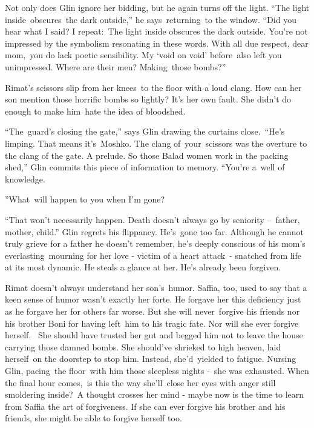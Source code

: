 \documentclass[twoside,11pt]{book}
\begin{document}
{Not only does Glin
}ignore{ her bidding, but he again turns off the light. ``The light
inside~o}bscures\ {the dark outside,{}'' he says\ returning\ to the
window. ``Did you hear what I said? I
repeat}{:}{\ The light inside
}obscures{ the dark outside. You're not impressed by the symbolism
resonating in these words. With all due respect, }dear mom,\ {you do
lack poetic sensibility. My `void on void' }before\ also left you
unimpressed.{ Where are their men?
}Making{~those bombs?''}

Rimat's scissors slip from her knees\ to the floor with a loud clang. How can her son mention those horrific bombs so
lightly? It's her own fault. She didn't do enough to make him\ hate the idea of bloodshed.

{}``The~guard{}'s closing the gate,{}'' says Glin drawing the curtains close.\ {}``He's limping. That means
it's\ Moshko. The clang of~your~scissors was the overture to the clang of the gate. A prelude. So those Balad women
work in the packing shed,{}'' Glin commits this piece of information to memory. ``You're a~well of
knowledge.{\textquotedbl}

{}''What\ will happen to you when I'm gone?{\textquotedbl}\ 

{}``That won't necessarily happen. Death doesn't always go by seniority --\ father, mother, child.'' Glin regrets his
flippancy. He{}'s\ gone too far. Although he cannot truly grieve for a father he doesn't remember, he{}'s deeply
conscious of his mom{}'s everlasting\ mourning for her love -  victim of a heart attack\ {}- snatched from life at its
most dynamic. He steals a glance at her. He{}'s already been forgiven.

{Rimat doesn't always understand her son's~humor. Saffia, too, used to
say that a keen sense of humor wasn't exactly her forte. }He forgave her this deficiency just as he forgave her for
others far worse. But she will never\ forgive his friends nor his brother Boni for having left~him to his tragic fate.
Nor will she ever forgive herself.~ She should have trusted her gut and begged him not to leave the house carrying
those damned bombs. She should've shrieked to high heaven, laid herself\ on the doorstep to stop him. Instead,
she'd~yielded to fatigue. Nursing Glin, pacing\ the floor\ with him those sleepless nights -\ she was exhausted. When
the final hour comes,\ is this the way she'll\ close her eyes with anger still smoldering inside?\ A thought crosses
her mind - maybe now is the time to learn from Saffia the art of forgiveness. If she can ever forgive his brother
and{ his friends, she might be able to forgive herself too. }
\end{document}
